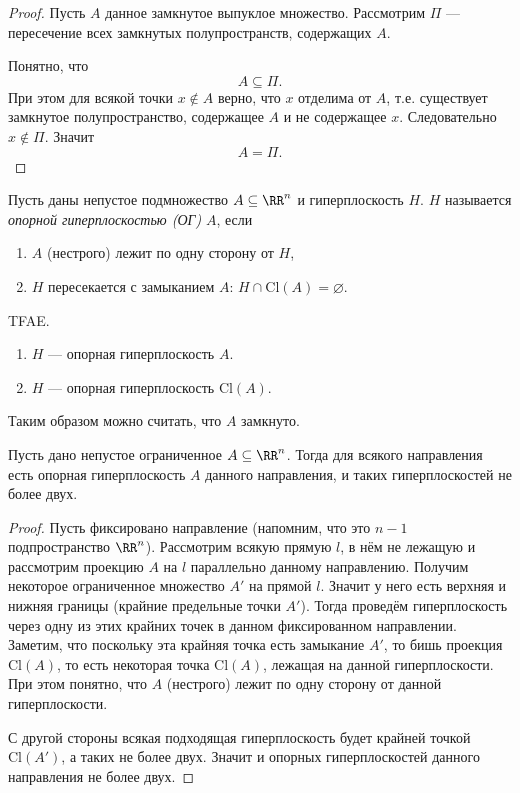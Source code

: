 \documentclass[12pt,a4paper]{article}
\newcommand{\Cl}{\ensuremath{\mathrm{Cl}}\xspace}
\begin{document}
    \begin{proof}
        Пусть $A$ данное замкнутое выпуклое множество. Рассмотрим $\Pi$ --- пересечение всех замкнутых полупространств, содержащих $A$.

        Понятно, что
        \[A \subseteq \Pi.\]
        При этом для всякой точки $x \notin A$ верно, что $x$ отделима от $A$, т.е. существует замкнутое полупространство, содержащее $A$ и не содержащее $x$. Следовательно $x \notin \Pi$. Значит
        \[A = \Pi.\]
    \end{proof}

    \begin{definition}
        Пусть даны непустое подмножество $A \subseteq \RR^n$ и гиперплоскость $H$. $H$ называется \emph{опорной гиперплоскостью (ОГ)} $A$, если
        \begin{enumerate}
            \item $A$ (нестрого) лежит по одну сторону от $H$,
            \item $H$ пересекается с замыканием $A$: $H \cap \Cl(A) = \varnothing$.
        \end{enumerate}
    \end{definition}

    \begin{remark}
        TFAE.
        \begin{enumerate}
            \item $H$ --- опорная гиперплоскость $A$.
            \item $H$ --- опорная гиперплоскость $\Cl(A)$.
        \end{enumerate}
        Таким образом можно считать, что $A$ замкнуто.
    \end{remark}

    \begin{theorem}
        Пусть дано непустое ограниченное $A \subseteq \RR^n$. Тогда для всякого направления есть опорная гиперплоскость $A$ данного направления, и таких гиперплоскостей не более двух.
    \end{theorem}

    \begin{proof}
        Пусть фиксировано направление (напомним, что это $n-1$ подпространство $\RR^n$). Рассмотрим всякую прямую $l$, в нём не лежащую и рассмотрим проекцию $A$ на $l$ параллельно данному направлению. Получим некоторое ограниченное множество $A'$ на прямой $l$. Значит у него есть верхняя и нижняя границы (крайние предельные точки $A'$). Тогда проведём гиперплоскость через одну из этих крайних точек в данном фиксированном направлении. Заметим, что поскольку эта крайняя точка есть замыкание $A'$, то бишь проекция $\Cl(A)$, то есть некоторая точка $\Cl(A)$, лежащая на данной гиперплоскости. При этом понятно, что $A$ (нестрого) лежит по одну сторону от данной гиперплоскости.

        С другой стороны всякая подходящая гиперплоскость будет крайней точкой $\Cl(A')$, а таких не более двух. Значит и опорных гиперплоскостей данного направления не более двух.
    \end{proof}
\end{document}
